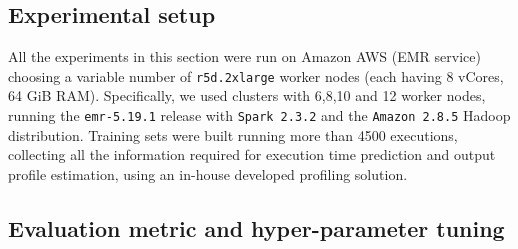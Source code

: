 \documentclass[a4paper, 10pt, conference]{ieeeconf}      %
\begin{document}

\subsection{Experimental setup}
\label{subsec:exp-setup}
\color{black}All the experiments in this section were run on Amazon AWS (EMR service) \color{black}choosing a variable number of \texttt{r5d.2xlarge} worker nodes (each having 8 vCores, 64 GiB RAM). Specifically, we used clusters with 6,8,10 and 12 worker nodes, running the \texttt{emr-5.19.1} release with \texttt{Spark 2.3.2} and the \texttt{Amazon 2.8.5} Hadoop distribution.
Training sets were built running more than 4500 executions, collecting all the information required for execution time prediction and output profile estimation, using an in-house developed profiling solution.

\subsection{Evaluation metric and hyper-parameter tuning}
\label{subsec:error-hyper}
\end{document}
